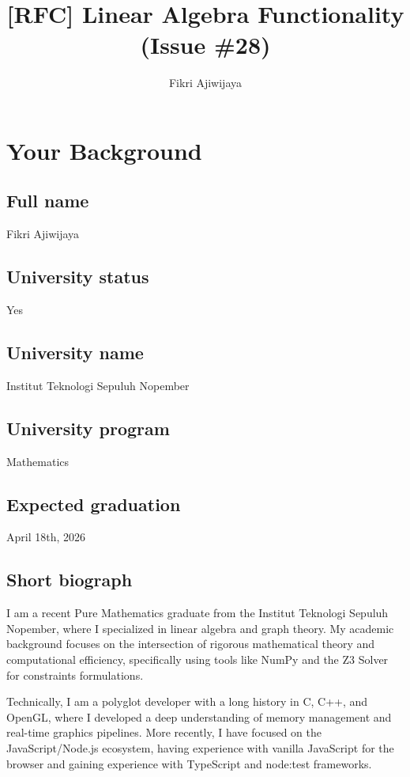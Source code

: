 \documentclass[
	a4paper,
	12pt
]{article}
\title{[RFC] Linear Algebra Functionality (Issue \#28)}
\author{Fikri Ajiwijaya}
\date{}
\begin{document}
\maketitle

\section{Your Background}

\subsection{Full name}
Fikri Ajiwijaya

\subsection{University status}
Yes

\subsection{University name}
Institut Teknologi Sepuluh Nopember

\subsection{University program}
Mathematics

\subsection{Expected graduation}
April 18th, 2026

\subsection{Short biograph}

I am a recent Pure Mathematics graduate from the Institut Teknologi Sepuluh Nopember, where I specialized in linear algebra and graph theory. My academic background focuses on the intersection of rigorous mathematical theory and computational efficiency, specifically using tools like NumPy and the Z3 Solver for constraints formulations.

Technically, I am a polyglot developer with a long history in C, C++, and OpenGL, where I developed a deep understanding of memory management and real-time graphics pipelines. More recently, I have focused on the JavaScript/Node.js ecosystem, having experience with vanilla JavaScript for the browser and gaining experience with TypeScript and node:test frameworks.
\end{document}
